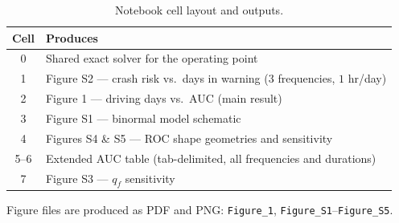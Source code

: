 \documentclass[11pt]{article}
\numberwithin{equation}{section}
\begin{document}
\begin{table}[htbp]
\caption{Notebook cell layout and outputs.}
\label{tab:cells}
\centering
\begin{tabular}{cl}
\toprule
Cell & Produces \\
\midrule
0 & Shared exact solver for the operating point \\
1 & Figure S2 --- crash risk vs.\ days in warning ($3$ frequencies, $1$ hr/day) \\
2 & Figure 1 --- driving days vs.\ AUC (main result) \\
3 & Figure S1 --- binormal model schematic \\
4 & Figures S4 \& S5 --- ROC shape geometries and sensitivity \\
5--6 & Extended AUC table (tab-delimited, all frequencies and durations) \\
7 & Figure S3 --- $q_f$ sensitivity \\
\bottomrule
\end{tabular}
\end{table}

Figure files are produced as PDF and PNG: \texttt{Figure\_1},
\texttt{Figure\_S1}--\texttt{Figure\_S5}.
\end{document}
